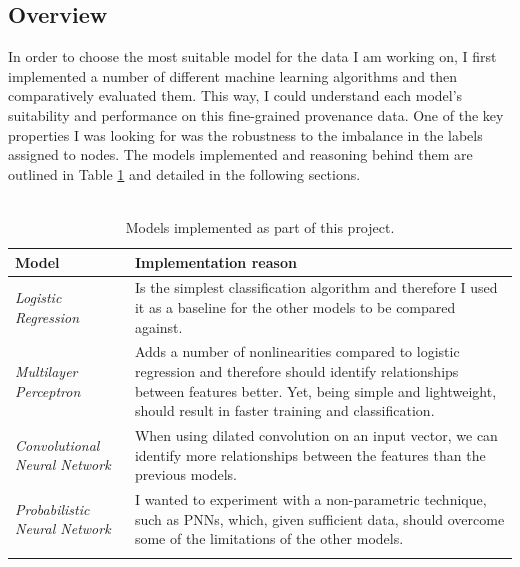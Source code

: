 	\subsection{Overview} \label{Section: impl/ml/overview}
	In order to choose the most suitable model for the data I am working on, I first implemented a number of different machine learning algorithms and then comparatively evaluated them. This way, I could understand each model's suitability and performance on this fine-grained provenance data. One of the key properties I was looking for was the robustness to the imbalance in the labels assigned to nodes. The models implemented and reasoning behind them are outlined in Table \ref{Table: impl/ml/overview/models} and detailed in the following sections.
	\\ \\
	\begin{longtable}{|p{}|p{}|}
		\textbf{Model} & \textbf{Implementation reason} \\
		\hline
		\textit{Logistic Regression} & Is the simplest classification algorithm and therefore I used it as a baseline for the other models to be compared against. \\
		\hline 
		\textit{Multilayer Perceptron} & Adds a number of nonlinearities compared to logistic regression and therefore should identify relationships between features better. Yet, being simple and lightweight, should result in faster training and classification. \\
		\hline
		\textit{Convolutional Neural Network} & When using dilated convolution on an input vector, we can identify more relationships between the features than the previous models. \\
		\hline
		\textit{Probabilistic Neural Network} & I wanted to experiment with a non-parametric technique, such as PNNs, which, given sufficient data, should overcome some of the limitations of the other models. \\
		\hline
		\caption{Models implemented as part of this project.}
		\label{Table: impl/ml/overview/models}
	\end{longtable}

